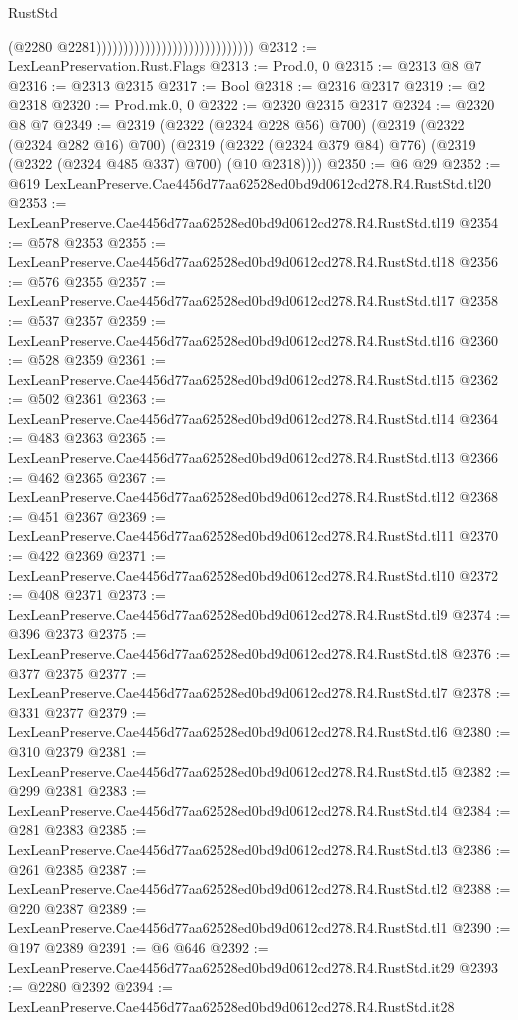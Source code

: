 \begin{lexlean}{RustStd}
\begin{coremodule}
                                                            (@2280
                                                              @2281)))))))))))))))))))))))))))))
@2312 := LexLeanPreservation.Rust.Flags
@2313 := Prod.{0, 0}
@2315 := @2313 @8 @7
@2316 := @2313 @2315
@2317 := Bool
@2318 := @2316 @2317
@2319 := @2 @2318
@2320 := Prod.mk.{0, 0}
@2322 := @2320 @2315 @2317
@2324 := @2320 @8 @7
@2349 := @2319
    (@2322 (@2324 @228 @56) @700)
    (@2319
      (@2322 (@2324 @282 @16) @700)
      (@2319 (@2322 (@2324 @379 @84) @776) (@2319 (@2322 (@2324 @485 @337) @700) (@10 @2318))))
@2350 := @6 @29
@2352 := @619 LexLeanPreserve.Cae4456d77aa62528ed0bd9d0612cd278.R4.RustStd.tl20
@2353 := LexLeanPreserve.Cae4456d77aa62528ed0bd9d0612cd278.R4.RustStd.tl19
@2354 := @578 @2353
@2355 := LexLeanPreserve.Cae4456d77aa62528ed0bd9d0612cd278.R4.RustStd.tl18
@2356 := @576 @2355
@2357 := LexLeanPreserve.Cae4456d77aa62528ed0bd9d0612cd278.R4.RustStd.tl17
@2358 := @537 @2357
@2359 := LexLeanPreserve.Cae4456d77aa62528ed0bd9d0612cd278.R4.RustStd.tl16
@2360 := @528 @2359
@2361 := LexLeanPreserve.Cae4456d77aa62528ed0bd9d0612cd278.R4.RustStd.tl15
@2362 := @502 @2361
@2363 := LexLeanPreserve.Cae4456d77aa62528ed0bd9d0612cd278.R4.RustStd.tl14
@2364 := @483 @2363
@2365 := LexLeanPreserve.Cae4456d77aa62528ed0bd9d0612cd278.R4.RustStd.tl13
@2366 := @462 @2365
@2367 := LexLeanPreserve.Cae4456d77aa62528ed0bd9d0612cd278.R4.RustStd.tl12
@2368 := @451 @2367
@2369 := LexLeanPreserve.Cae4456d77aa62528ed0bd9d0612cd278.R4.RustStd.tl11
@2370 := @422 @2369
@2371 := LexLeanPreserve.Cae4456d77aa62528ed0bd9d0612cd278.R4.RustStd.tl10
@2372 := @408 @2371
@2373 := LexLeanPreserve.Cae4456d77aa62528ed0bd9d0612cd278.R4.RustStd.tl9
@2374 := @396 @2373
@2375 := LexLeanPreserve.Cae4456d77aa62528ed0bd9d0612cd278.R4.RustStd.tl8
@2376 := @377 @2375
@2377 := LexLeanPreserve.Cae4456d77aa62528ed0bd9d0612cd278.R4.RustStd.tl7
@2378 := @331 @2377
@2379 := LexLeanPreserve.Cae4456d77aa62528ed0bd9d0612cd278.R4.RustStd.tl6
@2380 := @310 @2379
@2381 := LexLeanPreserve.Cae4456d77aa62528ed0bd9d0612cd278.R4.RustStd.tl5
@2382 := @299 @2381
@2383 := LexLeanPreserve.Cae4456d77aa62528ed0bd9d0612cd278.R4.RustStd.tl4
@2384 := @281 @2383
@2385 := LexLeanPreserve.Cae4456d77aa62528ed0bd9d0612cd278.R4.RustStd.tl3
@2386 := @261 @2385
@2387 := LexLeanPreserve.Cae4456d77aa62528ed0bd9d0612cd278.R4.RustStd.tl2
@2388 := @220 @2387
@2389 := LexLeanPreserve.Cae4456d77aa62528ed0bd9d0612cd278.R4.RustStd.tl1
@2390 := @197 @2389
@2391 := @6 @646
@2392 := LexLeanPreserve.Cae4456d77aa62528ed0bd9d0612cd278.R4.RustStd.it29
@2393 := @2280 @2392
@2394 := LexLeanPreserve.Cae4456d77aa62528ed0bd9d0612cd278.R4.RustStd.it28

\end{coremodule}
\end{lexlean}
